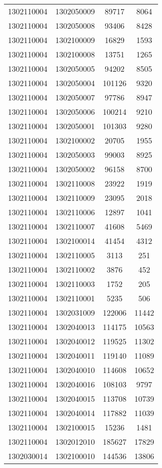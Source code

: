 \begin{longtable}[h]{llcc}
		1302110004 & 1302050009 & 89717 & 8064\\
		1302110004 & 1302050008 & 93406 & 8428\\
		1302110004 & 1302100009 & 16829 & 1593\\
		1302110004 & 1302100008 & 13751 & 1265\\
		1302110004 & 1302050005 & 94202 & 8505\\
		1302110004 & 1302050004 & 101126 & 9320\\
		1302110004 & 1302050007 & 97786 & 8947\\
		1302110004 & 1302050006 & 100214 & 9210\\
		1302110004 & 1302050001 & 101303 & 9280\\
		1302110004 & 1302100002 & 20705 & 1955\\
		1302110004 & 1302050003 & 99003 & 8925\\
		1302110004 & 1302050002 & 96158 & 8700\\
		1302110004 & 1302110008 & 23922 & 1919\\
		1302110004 & 1302110009 & 23095 & 2018\\
		1302110004 & 1302110006 & 12897 & 1041\\
		1302110004 & 1302110007 & 41608 & 5469\\
		1302110004 & 1302100014 & 41454 & 4312\\
		1302110004 & 1302110005 & 3113 & 251\\
		1302110004 & 1302110002 & 3876 & 452\\
		1302110004 & 1302110003 & 1752 & 205\\
		1302110004 & 1302110001 & 5235 & 506\\
		1302110004 & 1302031009 & 122006 & 11442\\
		1302110004 & 1302040013 & 114175 & 10563\\
		1302110004 & 1302040012 & 119525 & 11302\\
		1302110004 & 1302040011 & 119140 & 11089\\
		1302110004 & 1302040010 & 114608 & 10652\\
		1302110004 & 1302040016 & 108103 & 9797\\
		1302110004 & 1302040015 & 113708 & 10739\\
		1302110004 & 1302040014 & 117882 & 11039\\
		1302110004 & 1302100015 & 15236 & 1481\\
		1302110004 & 1302012010 & 185627 & 17829\\
		1302030014 & 1302100010 & 144536 & 13806\\

\end{longtable}
